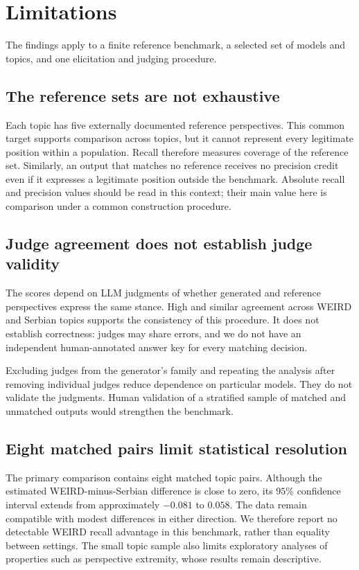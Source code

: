 \documentclass[11pt,a4paper]{article}
\begin{document}
\section{Limitations}
\label{sec:Limitations}
The findings apply to a finite reference benchmark, a selected set of models and topics, and one elicitation and judging procedure.

\subsection{The reference sets are not exhaustive}
\label{sec:The reference sets are not exhaustive}
Each topic has five externally documented reference perspectives. This common target supports comparison across topics, but it cannot represent every legitimate position within a population. Recall therefore measures coverage of the reference set. Similarly, an output that matches no reference receives no precision credit even if it expresses a legitimate position outside the benchmark. Absolute recall and precision values should be read in this context; their main value here is comparison under a common construction procedure.

\subsection{Judge agreement does not establish judge validity}
\label{sec:Judge agreement does not establish judge validity}
The scores depend on LLM judgments of whether generated and reference perspectives express the same stance. High and similar agreement across WEIRD and Serbian topics supports the consistency of this procedure. It does not establish correctness: judges may share errors, and we do not have an independent human-annotated answer key for every matching decision.

Excluding judges from the generator's family and repeating the analysis after removing individual judges reduce dependence on particular models. They do not validate the judgments. Human validation of a stratified sample of matched and unmatched outputs would strengthen the benchmark.

\subsection{Eight matched pairs limit statistical resolution}
\label{sec:Eight matched pairs limit the size of effects we can resolve}
The primary comparison contains eight matched topic pairs. Although the estimated WEIRD-minus-Serbian difference is close to zero, its $95$\% confidence interval extends from approximately $-0.081$ to $0.058$. The data remain compatible with modest differences in either direction. We therefore report no detectable WEIRD recall advantage in this benchmark, rather than equality between settings. The small topic sample also limits exploratory analyses of properties such as perspective extremity, whose results remain descriptive.
\end{document}
